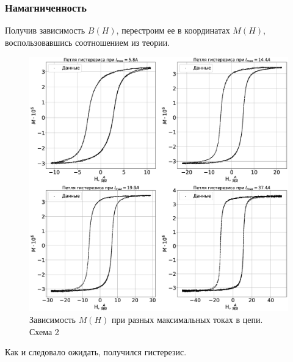 \documentclass[a4paper,14pt]{extarticle}
\begin{document}
			\subsubsection{Намагниченность}
				Получив зависимость $B(H)$, перестроим ее в координатах $M(H)$, воспользовавшись соотношением из теории.
				\begin{figure}[h!]
					\centering
					\includegraphics[width=1.0\linewidth]{Lab2_4.eps}
					\caption{Зависимость $M(H)$ при разных максимальных токах в цепи. Схема 2}
					\label{fig7}
				\end{figure}
				\newpage
				Как и следовало ожидать, получился гистерезис.
\end{document}
